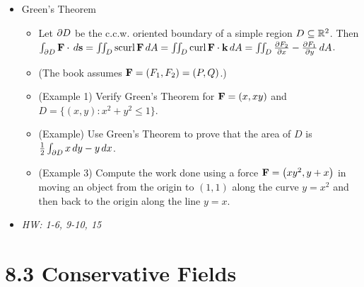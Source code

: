 \documentclass[11pt]{article}
\begin{document}
\begin{itemize}
  \item Green's Theorem
    \begin{itemize}
      \item Let \(\partial D\) be the c.c.w. oriented boundary of a simple region
        \(D\subseteq \mathbb R^2\). Then
        \(
          \int_{\partial D}\mathbf{F}\cdot\,d\mathbf{s}
            =
          \iint_D \textrm{scurl}\, \mathbf{F} \,d A
            =
          \iint_D \textrm{curl}\, \mathbf{F}\cdot \mathbf{k} \,d A
            =
          \iint_D \frac{\partial F_2}{\partial x}-\frac{\partial F_1}{\partial y}\,d A
        \).
      \item (The book assumes \(\mathbf{F}=\left(F_1,F_2\right)=\left(P,Q\right)\).)
      \item (Example 1) Verify Green's Theorem for \(\mathbf{F}=\left(x,xy\right)\)
        and \(D=\{(x,y):x^2+y^2\leq 1\}\).
      \item (Example) Use Green's Theorem to prove that the area of \(D\)
        is \(\frac{1}{2}\int_{\partial D}x\,d y-y\,d x\).
      \item (Example 3) Compute the work done using a force
        \(\mathbf{F}=\left(xy^2,y+x\right)\) in moving an object from the origin to \((1,1)\)
        along the curve \(y=x^2\) and then back to the origin along the line
        \(y=x\).
    \end{itemize}
  \item\textit{
    HW: 1-6, 9-10, 15
  }
\end{itemize}



\section*{8.3 Conservative Fields}
\end{document}
